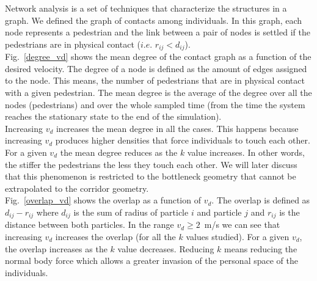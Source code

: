 \documentclass[preprint,12pt]{elsarticle}
\begin{document}
Network analysis is a set of techniques that characterize the structures in a graph. We defined the graph of contacts among individuals. In this graph, each node represents a pedestrian and the link between a pair of nodes is settled if the pedestrians are in physical contact ($i.e.$ $r_{ij}<d_{ij}$).\\

Fig.~\ref{degree_vd} shows the mean degree of the contact graph as a function of the desired velocity. The degree of a node is defined as the amount of edges assigned to the node. This means, the number of pedestrians that are in physical contact with a given pedestrian. The mean degree is the average of the degree over all the nodes (pedestrians) and over the whole sampled time (from the time the system reaches the stationary state to the end of the simulation).\\

Increasing $v_d$ increases the mean degree in all the cases. This happens because increasing $v_d$ produces higher densities that force individuals to touch each other. For a given $v_d$ the mean degree reduces as the $k$ value increases. In other words, the stiffer the pedestrians the less they touch each other. We will later discuss that this phenomenon is restricted to the bottleneck geometry that cannot be extrapolated to the corridor geometry.\\

Fig.~\ref{overlap_vd} shows the overlap as a function of $v_d$. The overlap is defined as $d_{ij}-r_{ij}$ where $d_{ij}$ is the sum of radius of particle $i$ and particle $j$ and $r_{ij}$  is the distance between both particles. In the range $v_d \geq 2$~m/s we can see that increasing $v_d$ increases the overlap (for all the $k$ values studied). For a given $v_d$, the overlap increases as the $k$ value decreases. Reducing $k$ means reducing the normal body force which allows a greater invasion of the personal space of the individuals.\\  
\end{document}
